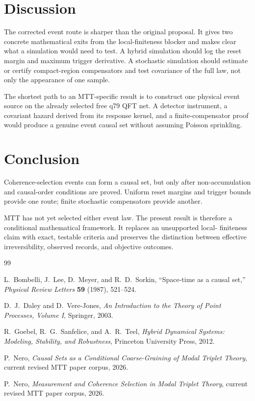 \documentclass[11pt]{article}
\theoremstyle{definition}
\theoremstyle{remark}
\begin{document}
\section{Discussion}

The corrected event route is sharper than the original proposal. It gives
two concrete mathematical exits from the local-finiteness blocker and makes
clear what a simulation would need to test. A hybrid simulation should log
the reset margin and maximum trigger derivative. A stochastic simulation
should estimate or certify compact-region compensators and test covariance
of the full law, not only the appearance of one sample.

The shortest path to an MTT-specific result is to construct one physical
event source on the already selected free q79 QFT net. A detector
instrument, a covariant hazard derived from its response kernel, and a
finite-compensator proof would produce a genuine event causal set without
assuming Poisson sprinkling.

\section{Conclusion}

Coherence-selection events can form a causal set, but only after
non-accumulation and causal-order conditions are proved. Uniform reset
margins and trigger bounds provide one route; finite stochastic compensators
provide another.

MTT has not yet selected either event law. The present result is therefore a
conditional mathematical framework. It replaces an unsupported local-
finiteness claim with exact, testable criteria and preserves the distinction
between effective irreversibility, observed records, and objective outcomes.

\begin{thebibliography}{99}

L.~Bombelli, J.~Lee, D.~Meyer, and R.~D.~Sorkin,
``Space-time as a causal set,''
\emph{Physical Review Letters} \textbf{59} (1987), 521--524.

D.~J.~Daley and D.~Vere-Jones,
\emph{An Introduction to the Theory of Point Processes, Volume I},
Springer, 2003.

R.~Goebel, R.~G.~Sanfelice, and A.~R.~Teel,
\emph{Hybrid Dynamical Systems: Modeling, Stability, and Robustness},
Princeton University Press, 2012.

P.~Nero,
\emph{Causal Sets as a Conditional Coarse-Graining of Modal Triplet
Theory},
current revised MTT paper corpus, 2026.

P.~Nero,
\emph{Measurement and Coherence Selection in Modal Triplet Theory},
current revised MTT paper corpus, 2026.

\end{thebibliography}
\end{document}
